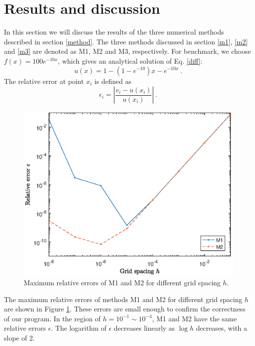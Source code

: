 \documentclass{article}
\begin{document}
	\section{Results and discussion}\label{result}
	In this section we will discuss the results of the three numerical methods described in section \ref{method}. 
	The three methods discussed in section \ref{m1}, \ref{m2} and \ref{m3} are denoted as M1, M2 and M3, respectively.  
	For benchmark, we choose $f(x)=100 e^{-10x}$, which gives an analytical
	solution of Eq. \ref{diff}: 
	\begin{equation}
	u(x)=1-\left(1-e^{-10}\right)x-e^{-10x}\ .
	\end{equation}
	The relative error at point $x_i$ is defined as 
	\begin{equation}
	\epsilon_i=\left| \frac{v_i-u(x_i)}{u(x_i)}\right|\ .
	\end{equation}
	\par
	\begin{figure}[tb]
		\centering
		\includegraphics[width=\textwidth]{fig_error.eps}
		\caption{Maximum relative errors of M1 and M2 for different grid spacing $h$. }
		\label{fig:error}
	\end{figure}
	The maximum relative errors of methods M1 and M2 for different grid spacing $h$ are shown in Figure \ref{fig:error}. 
	These errors are small enough to confirm the correctness of our program. 
	In the region of $h=10^{-1} \sim 10^{-4}$, M1 and M2 have the same relative errors $\epsilon$. 
	The logarithm of $\epsilon$ decreases linearly as $\log h$ decreases, with a slope of 2. 
\end{document}
